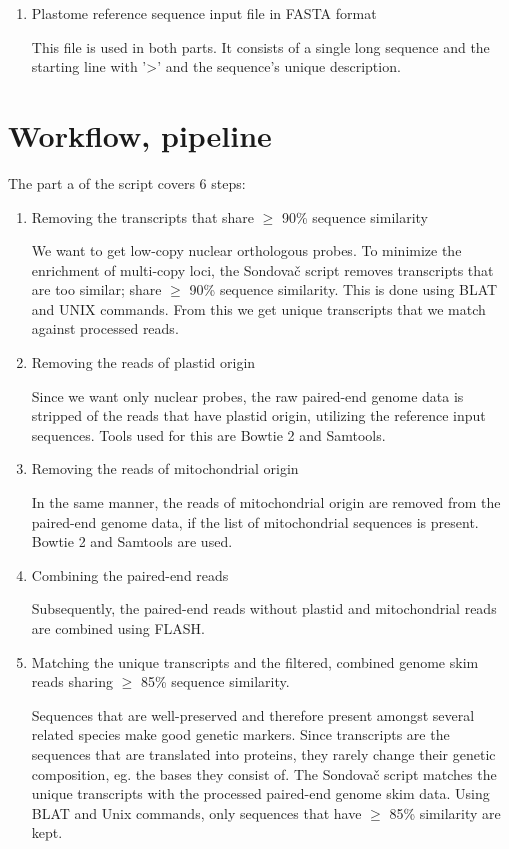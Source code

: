 \begin{enumerate}
\begin{enumerate}
\item Plastome reference sequence input file in FASTA format

This file is used in both parts. It consists of a single long sequence and the starting line with '>' and the sequence's 
unique description. 
\end{enumerate}


\section{Workflow, pipeline}

The part a of the script covers 6 steps: 

\begin{enumerate}
\item Removing the transcripts that share $\geq$ 90\% sequence similarity

We want to get low-copy nuclear orthologous probes. To minimize the enrichment of multi-copy loci, the Sondovač script removes transcripts that 
are too similar; share $\geq$ 90\% sequence similarity. This is done using BLAT and UNIX commands. From this we get unique transcripts that we match against processed reads. 

\item Removing the reads of plastid origin

Since we want only nuclear probes, the raw paired-end genome data is stripped of the reads that have plastid origin, utilizing the reference input sequences. Tools used for 
this are Bowtie 2 and Samtools. 

\item Removing the reads of mitochondrial origin

In the same manner, the reads of mitochondrial origin are removed from the paired-end genome data, if the list of mitochondrial sequences is present. Bowtie 2 and Samtools are 
used. 

\item Combining the paired-end reads

Subsequently, the paired-end reads without plastid and mitochondrial reads are combined using FLASH. 

\item Matching the unique transcripts and the filtered, combined genome skim reads sharing $\geq$ 85\% sequence similarity. 

Sequences that are well-preserved and therefore present amongst several related species make good genetic markers. Since transcripts are 
the sequences that are translated into proteins, they rarely change their genetic composition, eg. the bases they consist of. The Sondovač 
script matches the unique transcripts with the processed paired-end genome skim data. Using BLAT and Unix commands, only sequences that have 
$\geq$ 85\% similarity are kept.  


\end{enumerate}
\end{enumerate}
